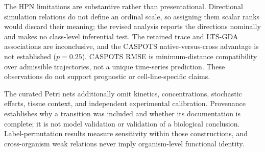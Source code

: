\documentclass{ws-jbcb}
\numberwithin{equation}{section}
\begin{document}
\begin{table}[t]
\end{table}

The HPN limitations are substantive rather than presentational. Directional
simulation relations do not define an ordinal scale, so assigning them scalar
ranks would discard their meaning; the revised analysis reports the directions
nominally and makes no class-level inferential test. The retained trace and
LTS-GDA associations are inconclusive, and the CASPOTS native-versus-cross
advantage is not established ($p=0.25$). CASPOTS RMSE is minimum-distance
compatibility over admissible trajectories, not a unique time-series
prediction.\cite{Razzaq2018} These observations do not support prognostic or
cell-line-specific claims.

The curated Petri nets additionally omit kinetics, concentrations, stochastic
effects, tissue context, and independent experimental calibration. Provenance
establishes why a transition was included and whether its documentation is
complete; it is not model validation or validation of a biological conclusion.
Label-permutation results measure sensitivity within those constructions, and
cross-organism weak relations never imply organism-level functional identity.
\end{document}
